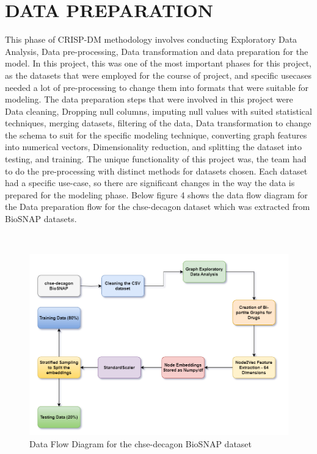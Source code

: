 \documentclass[journal,transmag]{J-NaNA}
\begin{document}
\section{DATA PREPARATION}
This phase of CRISP-DM methodology involves conducting Exploratory Data Analysis, Data pre-processing, Data transformation and data preparation for the model. In this project, this was one of the most important phases for this project, as the datasets that were employed for the course of project, and specific usecases needed a lot of pre-processing to change them into formats that were suitable for modeling. The data preparation steps that were involved in this project were Data cleaning, Dropping null columns, imputing null values with suited statistical techniques, merging datasets, filtering of the data, Data transformation to change the schema to suit for the specific modeling technique, converting graph features into numerical vectors, Dimensionality reduction, and splitting the dataset into testing, and training. The unique functionality of this project was, the team had to do the pre-processing with distinct methods for datasets chosen. Each dataset had a specific use-case, so there are significant changes in the way the data is prepared for the modeling phase. Below figure 4 shows the data flow diagram for the Data preparation flow for the chse-decagon dataset which was extracted from BioSNAP datasets.  

\\
\begin{figure}[htbp]
\centering
\includegraphics[width=\linewidth]{data_flow_chsedecagon.PNG} 
\caption{Data Flow Diagram for the chse-decagon BioSNAP dataset}
\label{fig: Chse-decagon data flow diagram} %
\end{figure}
\end{document}
